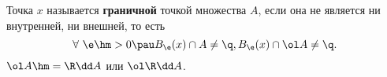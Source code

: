 
    Точка $x$ называется \textbf{граничной} точкой множества $A$, если она не является ни внутренней, ни внешней, то есть
    \[\forall\  \e\hm>0\pau B_\e(x)\cap A\neq\q, B_\e(x)\cap\ol A\neq\q.\]
    $\ol A\hm=\R\dd A$ или $\ol\R\dd A$.
